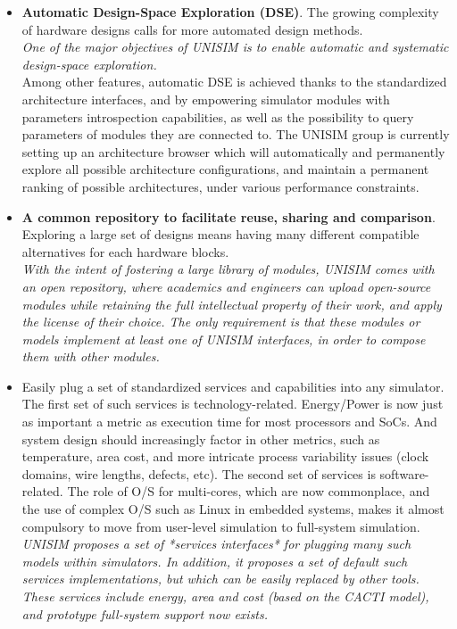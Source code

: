 \begin{itemize}
\item \textbf{Automatic Design-Space Exploration (DSE)}. The growing complexity of hardware designs calls for more automated design methods.\\
\emph{One of the major objectives of UNISIM is to enable automatic and systematic design-space exploration.}\\
Among other features, automatic DSE is achieved thanks to the standardized architecture interfaces, and by empowering simulator modules with parameters introspection capabilities, as well as the possibility to query parameters of modules they are connected to. The UNISIM group is currently setting up an architecture browser which will automatically and permanently explore all possible architecture configurations, and maintain a permanent ranking of possible architectures, under various performance constraints.
\item \textbf{A common repository to facilitate reuse, sharing and comparison}. Exploring a large set of designs means having many different compatible alternatives for each hardware blocks.\\
\emph{With the intent of fostering a large library of modules, UNISIM comes with an open repository, where academics and engineers can upload open-source modules while retaining the full intellectual property of their work, and apply the license of their choice. The only requirement is that these modules or models implement at least one of UNISIM interfaces, in order to compose them with other modules.}
\item Easily plug a set of standardized services and capabilities into any simulator. The first set of such services is technology-related. Energy/Power is now just as important a metric as execution time for most processors and SoCs. And system design should increasingly factor in other metrics, such as temperature, area cost, and more intricate process variability issues (clock domains, wire lengths, defects, etc). The second set of services is software-related. The role of O/S for multi-cores, which are now commonplace, and the use of complex O/S such as Linux in embedded systems, makes it almost compulsory to move from user-level simulation to full-system simulation.\\
\emph{UNISIM proposes a set of *services interfaces* for plugging many such models within simulators. In addition, it proposes a set of default such services implementations, but which can be easily replaced by other tools. These services include energy, area and cost (based on the CACTI model), and prototype full-system support now exists.}

\end{itemize}

